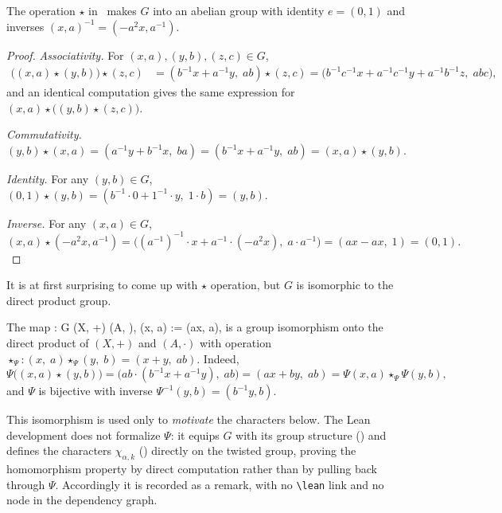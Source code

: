 \begin{lemma}\label{lem:group}\leanok
The operation $\star$ in~ makes $G$ into an abelian group with identity
$e = (0, 1)$ and inverses $(x, a)^{-1} = (-a^2 x, a^{-1})$. 
\end{lemma}

\begin{proof}\leanok
\emph{Associativity.} For $(x, a), (y, b), (z, c) \in G$,
\begin{align*}
\bigl((x, a) \star (y, b)\bigr) \star (z, c)
&= (b^{-1}x + a^{-1}y,\; ab) \star (z, c) = \bigl(b^{-1}c^{-1}x + a^{-1}c^{-1}y + a^{-1}b^{-1}z,\; abc\bigr),
\end{align*}
and an identical computation gives the same expression for $(x, a) \star \bigl((y, b) \star (z, c)\bigr)$.

\emph{Commutativity.}
$(y, b) \star (x, a) = (a^{-1}y + b^{-1}x,\; ba) = (b^{-1}x + a^{-1}y,\; ab) = (x, a) \star (y, b).$

\emph{Identity.} For any $(y, b) \in G$,
$(0, 1) \star (y, b) = (b^{-1}\cdot 0 + 1^{-1}\cdot y,\; 1\cdot b) = (y, b)$.

\emph{Inverse.} For any $(x, a) \in G$,
\[
(x, a) \star (-a^2 x, a^{-1}) = \bigl((a^{-1})^{-1}\cdot x + a^{-1}\cdot(-a^2 x),\; a\cdot a^{-1}\bigr)
= (ax - ax,\; 1) = (0, 1).
\]

\end{proof}

It is at first surprising to come up with $\star$ operation, but $G$ is isomorphic to the direct product group. 
\begin{remark}
The map
\be
\Psi : G \to (X, +) \times (A, \cdot), \qquad
\Psi(x, a) := (ax, a),
\ee
is a group isomorphism onto the direct product of $(X, +)$ and $(A, \cdot)$ with operation
$\star_\Psi:(x,\; a) \star_\Psi (y,\; b) = (x+y,\; ab)$. Indeed,
\[
\Psi\bigl((x, a) \star (y, b)\bigr) = \bigl(ab\cdot(b^{-1}x + a^{-1}y),\; ab\bigr) = (ax + by,\; ab)
= \Psi(x, a) \star_\Psi \Psi(y, b),
\]
and $\Psi$ is bijective with inverse $\Psi^{-1}(y, b) = (b^{-1}y, b)$.

This isomorphism is used only to \emph{motivate} the characters below. The Lean development does not
formalize $\Psi$: it equips $G$ with its group structure () and defines the characters
$\chi_{\alpha,k}$ () directly on the twisted group, proving the homomorphism
property by direct computation rather than by pulling back through $\Psi$. Accordingly it is recorded as a
remark, with no \texttt{\textbackslash lean} link and no node in the dependency graph.
\end{remark}

